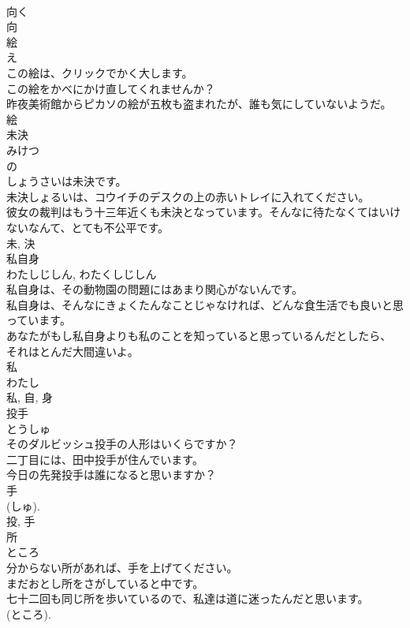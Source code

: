 \documentclass[8pt]{extreport}
\begin{document}
\begin{CJK}{UTF8}{min}
\\	向く 
\\	向	
\\	絵	
\\	え	
\\	この絵は、クリックでかく大します。	
\\	この絵をかべにかけ直してくれませんか？	
\\	昨夜美術館からピカソの絵が五枚も盗まれたが、誰も気にしていないようだ。	
\\	絵	
\\	未決	
\\	みけつ	
\\	の 
\\	しょうさいは未決です。	
\\	未決しょるいは、コウイチのデスクの上の赤いトレイに入れてください。	
\\	彼女の裁判はもう十三年近くも未決となっています。そんなに待たなくてはいけないなんて、とても不公平です。	
\\	未, 決	
\\	私自身	
\\	わたしじしん, わたくしじしん	
\\	私自身は、その動物園の問題にはあまり関心がないんです。	
\\	私自身は、そんなにきょくたんなことじゃなければ、どんな食生活でも良いと思っています。	
\\	あなたがもし私自身よりも私のことを知っていると思っているんだとしたら、 それはとんだ大間違いよ。	
\\	私 
\\	わたし 
\\	私, 自, 身	
\\	投手	
\\	とうしゅ	
\\	そのダルビッシュ投手の人形はいくらですか？	
\\	二丁目には、田中投手が住んでいます。	
\\	今日の先発投手は誰になると思いますか？	
\\	手 
\\	(しゅ). 
\\	投, 手	
\\	所	
\\	ところ	
\\	分からない所があれば、手を上げてください。	
\\	まだおとし所をさがしていると中です。	
\\	七十二回も同じ所を歩いているので、私達は道に迷ったんだと思います。	
\\	(ところ). 

\end{CJK}
\end{document}
